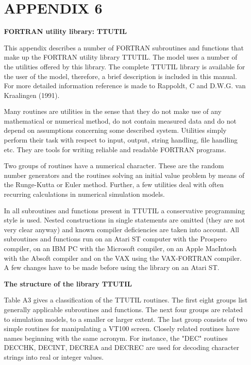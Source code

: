 \documentclass[11pt]{article}
\begin{document}
\setcounter{page}{141}\pagenumpos{\pnbr}
\section{  APPENDIX 6  }

\bigskip
{\bf {\large FORTRAN utility library: TTUTIL}}

This appendix describes a number of FORTRAN subroutines and functions that make up
the FORTRAN utility library TTUTIL. The model uses a number of the utilities offered
by this library. The complete TTUTIL library is available for the user of the model,
therefore, a brief description is included in this manual. For more detailed information
reference is made to Rappoldt, C and D.W.G. van Kraalingen (1991).

Many routines are utilities in the sense that they do not make use of any mathemati\-cal or
numerical method, do not contain measured data and do not depend on assumptions
concerning some described system. Utilities simply perform their task with respect to
input, output, string handling, file handling etc. They are tools for writing reliable and
readable FORTRAN programs. 

Two groups of routines have a numerical character. These are the random number
generators and the routines solving an initial value problem by means of the Runge-Kutta
or Euler method. Further, a few utilities deal with often recurring calculations in
numerical simulation models.

In all subroutines and functions present in TTUTIL a conservative programming style is
used. Nested constructions in single statements are omitted (they are not very clear
anyway) and known compiler deficiencies are taken into account. All subrou\-tines and
functions run on an Atari ST computer with the Prospero compiler, on an IBM PC with
the Microsoft compiler, on an Apple MacIntosh with the Absoft compiler and on the
VAX using the VAX-FORTRAN compiler. A few changes have to be made before using
the library on an Atari ST.

\bigskip
{\bf The structure of the library TTUTIL}

Table A3 gives a classification of the TTUTIL routines. The first eight groups list
generally applicable subroutines and functions. The next four groups are related to
simulation models, to a smaller or larger extent. The last group consists of two simple
routines for manipulating a VT100 screen. Closely related routines have names beginning
with the same acronym. For instance, the "DEC" routines DECCHK, DECINT,
DECREA and DECREC are used for decoding character strings into real or integer
values.
\end{document}
